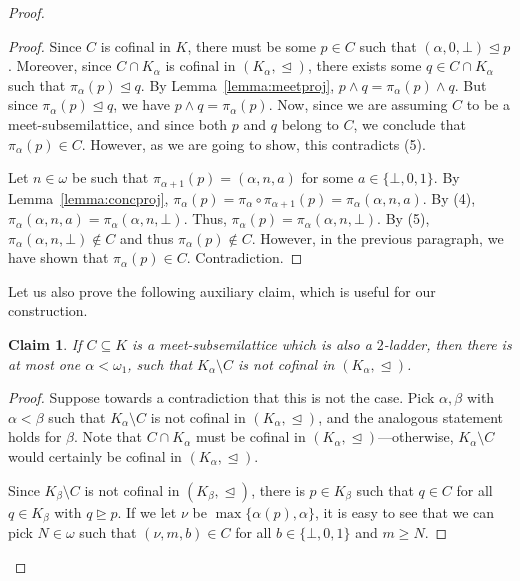 \documentclass[]{amsart}
\newtheorem{claim}{Claim}[theorem]
\theoremstyle{definition}
\theoremstyle{remark}
\begin{document}
\begin{proof}
\begin{proof}
Since $C$ is cofinal in $K$, there must be some $p \in C$ such that $(\alpha, 0, \bot) \trianglelefteq p$.  Moreover, since $C \cap K_\alpha$ is cofinal in $(K_\alpha, \trianglelefteq)$, there exists some $q \in C \cap  K_\alpha$ such that $\pi_{\alpha}(p) \trianglelefteq q$. By Lemma~\ref{lemma:meetproj}, $p \wedge q = \pi_\alpha(p) \wedge q$. But since $\pi_\alpha (p) \trianglelefteq q$, we have $p \wedge q = \pi_\alpha (p)$.  Now, since we are assuming $C$ to be a meet-subsemilattice, and since both $p$ and $q$ belong to $C$, we conclude that $\pi_\alpha(p) \in C$. However, as we are going to show, this contradicts (5).

Let $n\in\omega$  be such that $\pi_{\alpha+1}(p) =  (\alpha, n, a)$ for some $a \in \{\bot, 0, 1\}$. By Lemma~\ref{lemma:concproj}, $\pi_\alpha (p) = \pi_\alpha \circ \pi_{\alpha+1} (p) = \pi_\alpha (\alpha, n, a)$. By (4), $\pi_{\alpha}(\alpha, n, a) = \pi_{\alpha}(\alpha, n, \bot)$. Thus, $\pi_\alpha (p) = \pi_\alpha (\alpha, n, \bot)$. By (5), $\pi_\alpha (\alpha, n, \bot) \not\in C$ and thus $\pi_\alpha (p) \not\in C$. However, in the previous paragraph, we have shown that $\pi_\alpha(p) \in C$. Contradiction.
\end{proof}


Let us also prove the following auxiliary claim, which is useful for our construction.

\begin{claim}\label{claim:5}
If $C\subseteq K$ is a meet-subsemilattice which is also a $2$-ladder, then there is at most one $\alpha < \omega_1$, such that $K_{\alpha} \setminus C$ is not cofinal in $(K_{\alpha}, \trianglelefteq)$.
\end{claim}
\begin{proof}
Suppose towards a contradiction that this is not the case. Pick $\alpha, \beta$ with $\alpha < \beta$ such that $K_{\alpha} \setminus C$ is not cofinal in $(K_{\alpha}, \trianglelefteq)$, and the analogous statement holds for $\beta$. Note that $C \cap K_\alpha$ must be cofinal in $(K_\alpha, \trianglelefteq)$---otherwise, $K_\alpha \setminus C$ would certainly be cofinal in  $(K_\alpha, \trianglelefteq)$. 

Since $K_{\beta} \setminus C$ is not cofinal in $(K_{\beta}, \trianglelefteq)$, there is $p \in K_\beta$ such that $q \in C$ for all $q \in K_\beta$ with $q \trianglerighteq p$. If we let $\nu$ be $\max \{\alpha(p), \alpha\}$, it is easy to see that we can pick $N \in\omega$ such that $(\nu, m, b) \in C$ for all $b \in \{\bot, 0, 1\}$ and $m \ge N$. 


\end{proof}
\end{proof}
\end{document}
